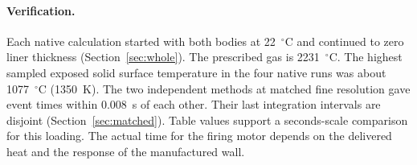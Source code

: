 \paragraph{Verification.}
Each native calculation started with both bodies at 22~$^\circ$C and
continued to zero liner thickness (Section~\ref{sec:whole}). The prescribed
gas is 2231~$^\circ$C. The highest sampled exposed solid surface temperature
in the four native runs was about 1077~$^\circ$C (1350~K).
The two independent methods at matched fine resolution gave event times
within 0.008~s of each other. Their last integration intervals are disjoint
(Section~\ref{sec:matched}). Table values support a seconds-scale comparison
for this loading. The actual time for the firing motor depends on the delivered
heat and the response of the manufactured wall.
\clearpage
